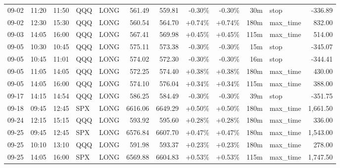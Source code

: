 \documentclass[11pt,a4paper]{article}
\begin{document}
\begin{center}
\begin{longtable}{>{\color{txtmain}}l l l l l r r r r r >{\color{txtmain}}l r}
09-02 & 11:20 & 11:50 & QQQ & LONG & 561.49 & 559.81 & \textcolor{lossred}{-0.30\%} & \textcolor{lossred}{-0.30\%} & 30m & stop & \textcolor{lossred}{-336.89} \\
09-02 & 12:30 & 15:30 & QQQ & LONG & 560.54 & 564.70 & \textcolor{wingreen}{+0.74\%} & \textcolor{wingreen}{+0.74\%} & 180m & max\_time & \textcolor{wingreen}{832.00} \\
09-03 & 14:05 & 16:00 & QQQ & LONG & 567.41 & 569.98 & \textcolor{wingreen}{+0.45\%} & \textcolor{wingreen}{+0.45\%} & 115m & max\_time & \textcolor{wingreen}{514.00} \\
09-05 & 10:30 & 10:45 & QQQ & LONG & 575.11 & 573.38 & \textcolor{lossred}{-0.30\%} & \textcolor{lossred}{-0.30\%} & 15m & stop & \textcolor{lossred}{-345.07} \\
09-05 & 10:45 & 11:01 & QQQ & LONG & 574.02 & 572.30 & \textcolor{lossred}{-0.30\%} & \textcolor{lossred}{-0.30\%} & 16m & stop & \textcolor{lossred}{-344.41} \\
09-05 & 11:05 & 14:05 & QQQ & LONG & 572.25 & 574.40 & \textcolor{wingreen}{+0.38\%} & \textcolor{wingreen}{+0.38\%} & 180m & max\_time & \textcolor{wingreen}{430.00} \\
09-05 & 14:05 & 16:00 & QQQ & LONG & 574.10 & 576.04 & \textcolor{wingreen}{+0.34\%} & \textcolor{wingreen}{+0.34\%} & 115m & max\_time & \textcolor{wingreen}{388.00} \\
09-17 & 14:15 & 14:54 & QQQ & LONG & 586.25 & 584.49 & \textcolor{lossred}{-0.30\%} & \textcolor{lossred}{-0.30\%} & 39m & stop & \textcolor{lossred}{-351.75} \\
09-18 & 09:45 & 12:45 & SPX & LONG & 6616.06 & 6649.29 & \textcolor{wingreen}{+0.50\%} & \textcolor{wingreen}{+0.50\%} & 180m & max\_time & \textcolor{wingreen}{1,661.50} \\
09-24 & 12:15 & 15:15 & QQQ & LONG & 593.92 & 595.60 & \textcolor{wingreen}{+0.28\%} & \textcolor{wingreen}{+0.28\%} & 180m & max\_time & \textcolor{wingreen}{336.00} \\
09-25 & 09:45 & 12:45 & SPX & LONG & 6576.84 & 6607.70 & \textcolor{wingreen}{+0.47\%} & \textcolor{wingreen}{+0.47\%} & 180m & max\_time & \textcolor{wingreen}{1,543.00} \\
09-25 & 10:10 & 13:10 & QQQ & LONG & 591.98 & 593.37 & \textcolor{wingreen}{+0.23\%} & \textcolor{wingreen}{+0.23\%} & 180m & max\_time & \textcolor{wingreen}{278.00} \\
09-25 & 14:05 & 16:00 & SPX & LONG & 6569.88 & 6604.83 & \textcolor{wingreen}{+0.53\%} & \textcolor{wingreen}{+0.53\%} & 115m & max\_time & \textcolor{wingreen}{1,747.50} \\

\end{longtable}
\end{center}
\end{document}
